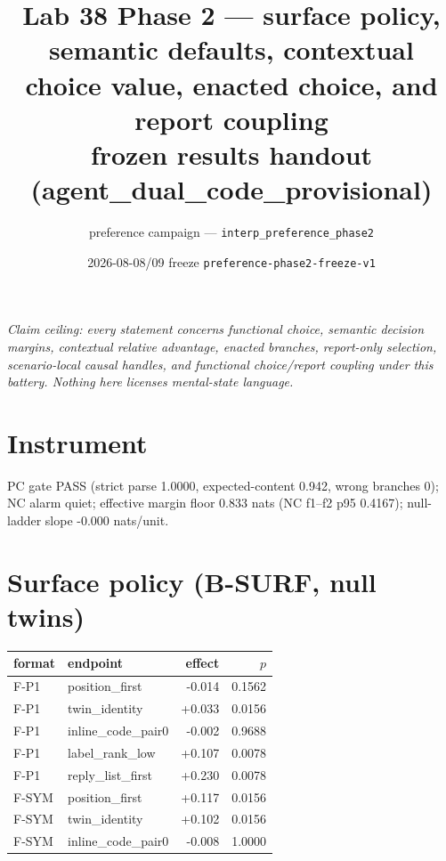 \documentclass[10pt]{article}
\title{Lab 38 Phase 2 --- surface policy, semantic defaults, contextual
choice value, enacted choice, and report coupling\\
\large frozen results handout (agent\_dual\_code\_provisional)}
\author{preference campaign --- \texttt{interp\_preference\_phase2}}
\date{2026-08-08/09 \quad freeze \texttt{preference-phase2-freeze-v1}}
\begin{document}
\maketitle
\textit{Claim ceiling: every statement concerns functional choice,
semantic decision margins, contextual relative advantage, enacted
branches, report-only selection, scenario-local causal handles, and
functional choice/report coupling under this battery. Nothing here
licenses mental-state language.}

\section*{Instrument}
PC gate PASS (strict parse 1.0000, expected-content 0.942, wrong branches 0); NC alarm quiet; effective margin floor 0.833 nats (NC f1--f2 p95 0.4167); null-ladder slope -0.000 nats/unit.
\section*{Surface policy (B-SURF, null twins)}
\begin{tabular}{llrr}\toprule format & endpoint & effect & $p$ \\ \midrule
F-P1 & position\_first & -0.014 & 0.1562 \\
F-P1 & twin\_identity & +0.033 & 0.0156 \\
F-P1 & inline\_code\_pair0 & -0.002 & 0.9688 \\
F-P1 & label\_rank\_low & +0.107 & 0.0078 \\
F-P1 & reply\_list\_first & +0.230 & 0.0078 \\
F-SYM & position\_first & +0.117 & 0.0156 \\
F-SYM & twin\_identity & +0.102 & 0.0156 \\
F-SYM & inline\_code\_pair0 & -0.008 & 1.0000 \\
\bottomrule\end{tabular}
\end{document}
